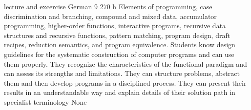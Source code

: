 {lecture and excercise}
{German}
{9}
{270 h}
{Elements of programming, case discrimination and branching, compound and mixed data, accumulator programming, higher-order functions, interactive programs, recursive data structures and recursive functions, pattern matching, program design, draft recipes, reduction semantics, and program equivalence.}
{Students know design guidelines for the systematic construction of computer programs and can use them properly. They recognize the characteristics of the functional paradigm and can assess its strengths and limitations. They can structure problems, abstract them and then develop programs in a disciplined process. They can present their results in an understandable way and explain details of their solution path in specialist terminology}
{None}